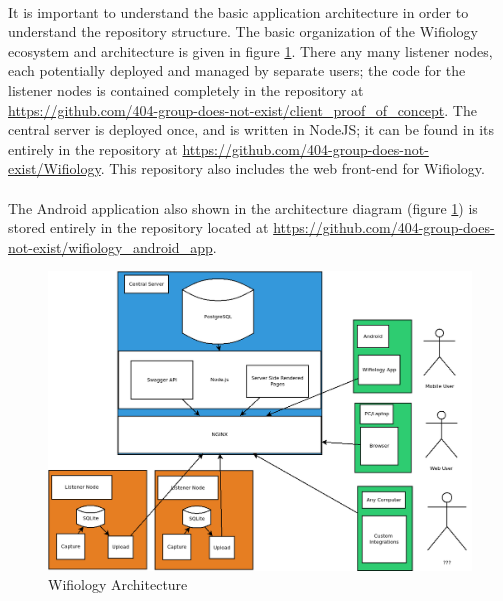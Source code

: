 \documentclass[]{article}
\begin{document}
	\paragraph{}
    It is important to understand the basic application architecture in order to understand the repository structure. The basic
    organization of the Wifiology ecosystem and architecture is given in figure \ref{fig:architecture}. There any many listener
    nodes, each potentially deployed and managed by separate users; the code for the listener nodes is contained completely in
    the repository at \href{https://github.com/404-group-does-not-exist/client\_proof\_of\_concept}{https://github.com/404-group-does-not-exist/client\_proof\_of\_concept}. The central server is deployed once, and is written in NodeJS; it can be found in its entirely in the
    repository at \href{https://github.com/404-group-does-not-exist/Wifiology}{https://github.com/404-group-does-not-exist/Wifiology}. 
    This repository also includes the web front-end for Wifiology.
    
    \paragraph{} The Android application also shown in the architecture diagram (figure \ref{fig:architecture}) is stored entirely in
    the repository located at \href{https://github.com/404-group-does-not-exist/wifiology\_android\_app}{https://github.com/404-group-does-not-exist/wifiology\_android\_app}.
	
	\begin{figure}[h]
	\label{fig:architecture}
	\includegraphics[width=1.0\textwidth]{basicWifiologyArchitecture}
	\caption{Wifiology Architecture}
	\end{figure}
	
\end{document}
